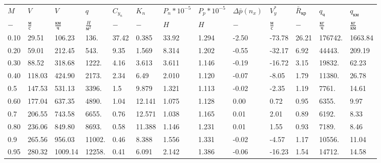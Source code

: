 \begin{tabular}{lllllllllllll}
$M$ & $V$ & $V$ & $q$ & $C_{y_n}$ & $K_n$ & $P_n*10^{-5}$ & $P_p*10^{-5}$ & $\Delta \bar{p}(n_x)$ & $V_y^*$ & $\bar{R}_{кр}$ & $q_{ч}$ & $q_{км}$ \\
$-$ & $\frac{м}{с}$ & $\frac{км}{ч}$ & $\frac{H}{м^2}$ & $-$ & $-$ & $H$ & $H$ & $-$ & $\frac{м}{с}$ & $-$ & $\frac{кг}{ч}$ & $\frac{кг}{км}$ \\
0.10 & 29.51 & 106.23 & 136. & 37.42 & 0.385 & 33.92 & 1.294 & -2.50 & -73.78 & 26.21 & 176742. & 1663.84 \\
0.20 & 59.01 & 212.45 & 543. & 9.35 & 1.569 & 8.314 & 1.202 & -0.55 & -32.17 & 6.92 & 44443. & 209.19 \\
0.30 & 88.52 & 318.68 & 1222. & 4.16 & 3.613 & 3.611 & 1.146 & -0.19 & -16.72 & 3.15 & 19832. & 62.23 \\
0.40 & 118.03 & 424.90 & 2173. & 2.34 & 6.49 & 2.010 & 1.120 & -0.07 & -8.05 & 1.79 & 11380. & 26.78 \\
0.5 & 147.53 & 531.13 & 3396. & 1.5 & 9.879 & 1.321 & 1.113 & -0.02 & -2.35 & 1.19 & 7761. & 14.61 \\
0.60 & 177.04 & 637.35 & 4890. & 1.04 & 12.141 & 1.075 & 1.128 & 0.00 & 0.72 & 0.95 & 6355. & 9.97 \\
0.7 & 206.55 & 743.58 & 6655. & 0.76 & 12.571 & 1.038 & 1.165 & 0.01 & 2.01 & 0.89 & 6192. & 8.33 \\
0.80 & 236.06 & 849.80 & 8693. & 0.58 & 11.388 & 1.146 & 1.231 & 0.01 & 1.55 & 0.93 & 7189. & 8.46 \\
0.9 & 265.56 & 956.03 & 11002. & 0.46 & 8.388 & 1.556 & 1.331 & -0.02 & -4.57 & 1.17 & 10556. & 11.04 \\
0.95 & 280.32 & 1009.14 & 12258. & 0.41 & 6.091 & 2.142 & 1.386 & -0.06 & -16.23 & 1.54 & 14712. & 14.58 \\
\end{tabular}
